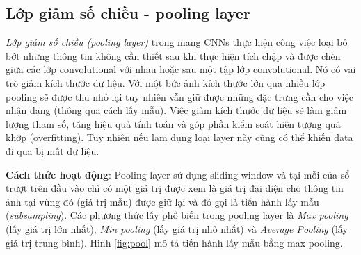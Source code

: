 \subsection{Lớp giảm số chiều -  pooling layer}
  \textit{Lớp giảm số chiều (pooling layer)} trong mạng CNNs thực hiện công việc loại bỏ bớt những thông tin không cần thiết sau khi thực hiện tích chập và được chèn giữa các lớp convolutional với nhau hoặc sau một tập lớp convolutional. Nó có vai trò giảm kích thước dữ liệu. Với một bức ảnh kích thước lớn qua nhiều lớp pooling sẽ được thu nhỏ lại tuy nhiên vẫn giữ được những đặc trưng cần cho việc nhận dạng (thông qua cách lấy mẫu). Việc giảm kích thước dữ liệu sẽ làm giảm lượng tham số, tăng hiệu quả tính toán và góp phần kiểm soát hiện tượng quá khớp (overfitting). Tuy nhiên nếu lạm dụng loại layer này cũng có thể khiến data đi qua bị mất dữ liệu.\par
\textbf{Cách thức hoạt động}: Pooling layer sử dụng sliding window và tại mỗi cửa sổ trượt trên đầu vào chỉ có một giá trị được xem là giá trị đại diện cho thông tin ảnh tại vùng đó (giá trị mẫu) được giữ lại và đó gọi là tiến hành lấy mẫu (\textit{subsampling}). Các phương thức lấy phổ biến trong pooling layer là \textit{Max pooling} (lấy giá trị lớn nhất), \textit{Min pooling} (lấy giá trị nhỏ nhất) và \textit{Average Pooling} (lấy giá trị trung bình). Hình \ref{fig:pool} mô tả tiến hành lấy mẫu bằng max pooling.

